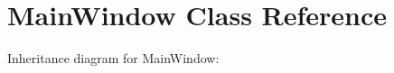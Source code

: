 \hypertarget{classMainWindow}{}\section{Main\+Window Class Reference}
\label{classMainWindow}


Inheritance diagram for Main\+Window\+:
